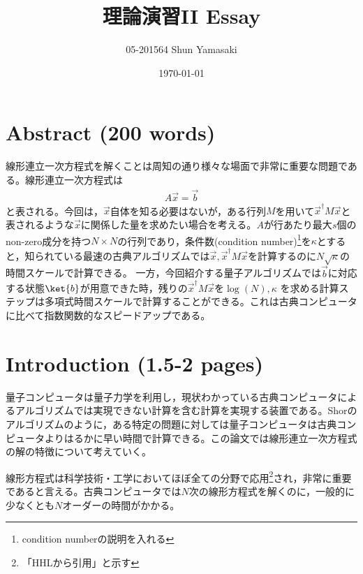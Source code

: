 \documentclass[b5paper,papersize,dvipdfmx,fleqn]{jsarticle}
\begin{document}
\title{理論演習II Essay}
\author{05-201564 Shun Yamasaki}
\date{\today}
\maketitle

\section{Abstract (200 words)}
線形連立一次方程式を解くことは周知の通り様々な場面で非常に重要な問題である。線形連立一次方程式は
\begin{eqnarray}
  A\vec{x} = \vec{b}
\end{eqnarray}
と表される。今回は，$\vec{x}$自体を知る必要はないが，ある行列$M$を用いて$\vec{x}^\dagger M \vec{x}$と表されるような$\vec{x}$に関係した量を求めたい場合を考える。$A$が行あたり最大$s$個のnon-zero成分を持つ$N\times N$の行列であり，条件数(condition number)\footnote{condition numberの説明を入れる}を$\kappa $とすると，知られている最速の古典アルゴリズムでは$\vec{x},\vec{x}^\dagger M \vec{x}$を計算するのに$N\sqrt{\kappa }$の時間スケールで計算できる。
一方，今回紹介する量子アルゴリズムでは$\vec{b}$に対応する状態$\ket{b}$が用意できた時，残りの$\vec{x}^\dagger M \vec{x}$を$\log(N),\kappa $ を求める計算ステップは多項式時間スケールで計算することができる。これは古典コンピュータに比べて指数関数的なスピードアップである。

\section{Introduction (1.5-2 pages)}

量子コンピュータは量子力学を利用し，現状わかっている古典コンピュータによるアルゴリズムでは実現できない計算を含む計算を実現する装置である。Shorのアルゴリズムのように，ある特定の問題に対しては量子コンピュータは古典コンピュータよりはるかに早い時間で計算できる。この論文では線形連立一次方程式の解の特徴について考えていく。


線形方程式は科学技術・工学においてほぼ全ての分野で応用\footnote{「HHLから引用」と示す}され，非常に重要であると言える。古典コンピュータでは$N$次の線形方程式を解くのに，一般的に少なくとも$N$オーダーの時間がかかる。
\end{document}
